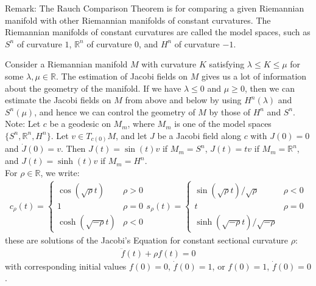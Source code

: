 \documentclass[11pt]{book}
\theoremstyle{break}
\theoremstyle{break}
\newcommand{\R}{\mathbb{R}}
\newcommand{\note}{\color{red}Note: \color{black}}
\newcommand{\remark}{\color{blue}Remark: \color{black}}
\begin{document}
\newpage
\remark The Rauch Comparison Theorem is for comparing a given Riemannian manifold with other Riemannian manifolds of constant curvatures. The Riemannian manifolds of constant curvatures are called the model spaces, such as $S^n$ of curvature $1$, $\R^n$ of curvature $0$, and $H^n$ of curvature $-1$. 

Consider a Riemannian manifold $M$ with curvature $K$ satisfying $\lambda \leq K \leq \mu$ for some $\lambda,\mu \in \R$. The estimation of Jacobi fields on $M$ gives us a lot of information about the geometry of the manifold. If we have $\lambda \leq 0$ and $\mu \geq 0$, then we can estimate the Jacobi fields on $M$ from above and below by using $H^n(\lambda)$ and $S^n(\mu)$, and hence we can control the geometry of $M$ by those of $H^n$ and $S^n$. \\

\note Let $c$ be a geodesic on $M_m$, where $M_m$ is one of the model spaces $\{S^n,\R^n, H^n\}$. Let $v \in T_{c(0)}M$, and let $J$ be a Jacobi field along $c$ with $J(0) = 0$ and $\dot{J}(0) = v$. Then $J(t) = \sin(t)v$ if $M_m = S^n$, $J(t) = tv$ if $M_m = \R^n$, and $J(t) = \sinh(t) v$ if $M_m = H^n$. \\


For $\rho\in \R$, we write:
\begin{align*}
c_\rho(t) = \begin{cases}
\cos(\sqrt{\rho}t) &  \rho>0\\
1 & \rho= 0\\
\cosh(\sqrt{-\rho}t) & \rho<0
\end{cases}
s_{\rho}(t) = 
\begin{cases}
\sin(\sqrt{\rho}t) /\sqrt{\rho} & \rho<0\\
t & \rho = 0\\
\sinh(\sqrt{-\rho}t)/\sqrt{-\rho}
\end{cases}
\end{align*}
these are solutions of the Jacobi's Equation for constant sectional curvature $\rho$:
\begin{align*}
\ddot{f}(t) + \rho f(t) = 0
\end{align*}
with corresponding initial values $f(0) = 0$, $\dot{f}(0) = 1$, or $f(0) = 1$, $\dot{f}(0) = 0$. 
\end{document}
